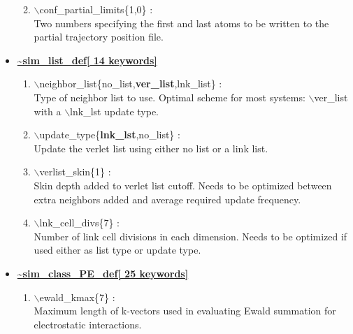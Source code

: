 \documentclass[12pt]{article}
\begin{document}
\begin{itemize}
\begin{enumerate}
 \vspace{0.15in} \Large
 \item   $\backslash$conf\_partial\_limits\{1,0\} : \\
   \large
   Two numbers specifying the first and last atoms to be written to
   the partial trajectory position file.

\end{enumerate}

\clearpage
\huge
\item[] \underline{\bf \~{}sim\_list\_def[ 14 keywords]}
\begin{enumerate}

 \vspace{0.15in} \Large
 \item   $\backslash$neighbor\_list\{no\_list,{\bf ver\_list},lnk\_list\} : \\
   \large
   Type of neighbor list to use.  Optimal scheme for most systems: 
   $\backslash$ver\_list with a $\backslash$lnk\_lst update type.

 \vspace{0.15in} \Large
 \item   $\backslash$update\_type\{{\bf lnk\_lst},no\_list\} : \\
   \large
   Update the verlet list using either no list or a link list.

 \vspace{0.15in} \Large
 \item   $\backslash$verlist\_skin\{1\} : \\
   \large
   Skin depth added to verlet list cutoff.  Needs to be optimized between
   extra neighbors added and average required update frequency.

 \vspace{0.15in} \Large
 \item   $\backslash$lnk\_cell\_divs\{7\} : \\
  \large
   Number of link cell divisions in each dimension.  Needs to be optimized
   if used either as list type or update type.

\end{enumerate}

\clearpage
\huge
\item[] \underline{\bf \~{}sim\_class\_PE\_def[ 25 keywords]}
\begin{enumerate}

 \vspace{0.15in} \Large
 \item   $\backslash$ewald\_kmax\{7\} : \\
  \large
  Maximum length of k-vectors used in evaluating Ewald summation for 
  electrostatic interactions.


\end{enumerate}
\end{itemize}
\end{document}
